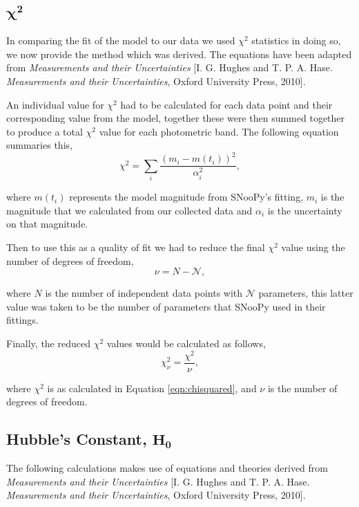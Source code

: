 \documentclass[twocolumn]{revtex4}
\begin{document}
{{{{{{\vspace{-2ex}
\subsection{$\boldsymbol{\chi^2}$}
\vspace{-2ex}
In comparing the fit of the model to our data we used $\chi^2$ statistics in doing so, we now provide the method which was derived. The equations have been adapted from \textit{Measurements and their Uncertainties} [I. G. Hughes and T. P. A. Hase. \textit{Measurements and their Uncertainties}, Oxford University Press, 2010].

An individual value for $\chi^2$ had to be calculated for each data point and their corresponding value from the model, together these were then summed together to produce a total $\chi^2$ value for each photometric band. The following equation summaries this,
\begin{equation}
\chi^2 = \sum_i \frac{(m_i - m(t_i))^2}{\alpha_i^2}, 
\label{eqn:chisquared}
\end{equation}

where $m(t_i)$ represents the model magnitude from SNooPy's fitting, $m_i$ is the magnitude that we calculated from our collected data and $\alpha_i$ is the uncertainty on that magnitude.

Then to use this as a quality of fit we had to reduce the final $\chi^2$ value using the number of degrees of freedom,
\begin{equation}
\nu = N - \mathcal{N},
\end{equation}

where $N$ is the number of independent data points with $\mathcal{N}$ parameters, this latter value was taken to be the number of parameters that SNooPy used in their fittings.

Finally, the reduced $\chi^2$ values would be calculated as follows,
\begin{equation}
\chi^2_{\nu} = \frac{\chi^2}{\nu},
\end{equation}

where $\chi^2$ is as calculated in Equation \ref{eqn:chisquared}, and $\nu$ is the number of degrees of freedom.

\vspace{-2ex}
\subsection{Hubble's Constant, $\boldsymbol{H_0}$}
\vspace{-2ex}
The following calculations makes use of equations and theories derived from \textit{Measurements and their Uncertainties} [I. G. Hughes and T. P. A. Hase. \textit{Measurements and their Uncertainties}, Oxford University Press, 2010].
 
}}}}}}
\end{document}
